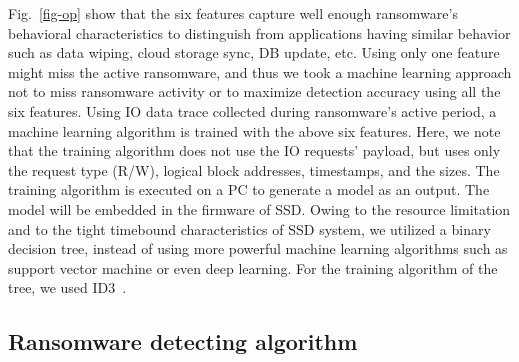\documentclass[conference]{IEEEtran}
\begin{document}
Fig.~\ref{fig-op} show that the six features capture well enough ransomware's behavioral characteristics
to distinguish from applications having similar behavior such as data wiping, cloud storage sync, DB update, etc.
Using only one feature might miss the active ransomware, 
and thus we took a machine learning approach not to miss 
ransomware activity or to maximize detection accuracy using all the six features. 
Using IO data trace collected during ransomware's active period, 
a machine learning algorithm is trained with the above six features. 
Here, we note that the training algorithm does not use the IO requests' payload, 
but uses only the request type (R/W), logical block addresses, timestamps, and the sizes.
The training algorithm is executed on a PC to generate a model as an output.
The model will be embedded in the firmware of SSD.
Owing to the resource limitation and to the tight timebound characteristics of SSD system,
we utilized a binary decision tree, instead of using more powerful machine learning
algorithms such as support vector machine or even deep learning.
For the training algorithm of the tree, we used ID3~\cite{quinlan86}.



\subsection{Ransomware detecting algorithm}
\label{sec:detection}
\end{document}
